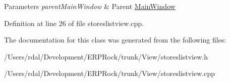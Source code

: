 \begin{DoxyParams}{\-Parameters}
{\em parent\-Main\-Window} & \-Parent \hyperlink{class_main_window}{\-Main\-Window} \\
\hline
\end{DoxyParams}


\-Definition at line 26 of file storeslistview.\-cpp.



\-The documentation for this class was generated from the following files\-:\begin{DoxyCompactItemize}
\item 
/\-Users/rdal/\-Development/\-E\-R\-P\-Rock/trunk/\-View/storeslistview.\-h\item 
/\-Users/rdal/\-Development/\-E\-R\-P\-Rock/trunk/\-View/storeslistview.\-cpp\end{DoxyCompactItemize}
